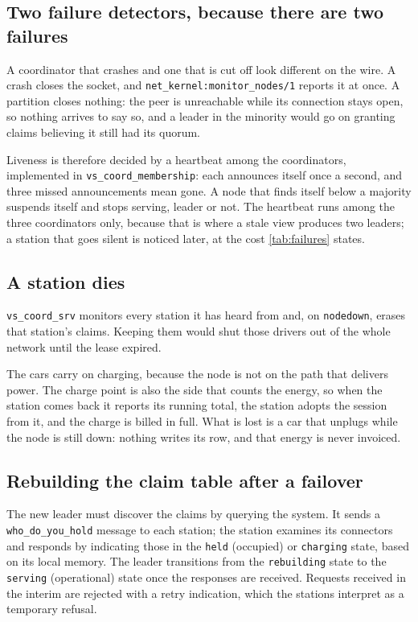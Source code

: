 \subsection{Two failure detectors, because there are two failures}
\label{sec:detectors}

A coordinator that crashes and one that is cut off look different on the wire. A
crash closes the socket, and \texttt{net\_kernel:monitor\_nodes/1} reports it at
once. A partition closes nothing: the peer is unreachable while its connection
stays open, so nothing arrives to say so, and a leader in the minority would go
on granting claims believing it still had its quorum.

Liveness is therefore decided by a heartbeat among the coordinators, implemented
in \texttt{vs\_coord\_membership}: each announces itself once a second, and three
missed announcements mean gone. A node that finds itself below a majority
suspends itself and stops serving, leader or not. The heartbeat runs among the
three coordinators only, because that is where a stale view produces two leaders;
a station that goes silent is noticed later, at the cost \cref{tab:failures}
states.

\subsection{A station dies}
\label{sec:station-failures}

\texttt{vs\_coord\_srv} monitors every station it has
heard from and, on \texttt{nodedown}, erases that station's claims. Keeping them
would shut those drivers out of the whole network until the lease expired.

The cars carry on charging, because the node is not on the path that delivers
power. The charge point is also the side that counts the energy, so when the
station comes back it reports its running total, the station adopts the session
from it, and the charge is billed in full. What is lost is a car that unplugs
while the node is still down: nothing writes its row, and that energy is never
invoiced.

\subsection{Rebuilding the claim table after a failover}
\label{sec:rebuild}

The new leader must discover the claims by querying the system.
It sends a \texttt{who\_do\_you\_hold} message to each station; the station examines its connectors and responds by indicating those in the \texttt{held} (occupied) or \texttt{charging} state, based on its local memory.
The leader transitions from the \texttt{rebuilding} state to the \texttt{serving} (operational) state once the responses are received.
Requests received in the interim are rejected with a retry indication, which the stations interpret as a temporary refusal.

